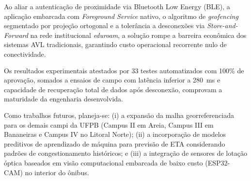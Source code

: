 \documentclass[lettersize,journal]{IEEEtran}
\begin{document}
Ao aliar a autenticação de proximidade via Bluetooth Low Energy (BLE), a aplicação embarcada com \textit{Foreground Service} nativo, o algoritmo de \textit{geofencing} segmentado por projeção ortogonal e a tolerância a desconexões via \textit{Store-and-Forward} na rede institucional \textit{eduroam}, a solução rompe a barreira econômica dos sistemas AVL tradicionais, garantindo custo operacional recorrente nulo de conectividade.

Os resultados experimentais atestados por 33 testes automatizados com 100\% de aprovação, somados a ensaios de campo com latência inferior a 280~ms e capacidade de recuperação total de dados após desconexão, comprovam a maturidade da engenharia desenvolvida.

Como trabalhos futuros, planeja-se: (i) a expansão da malha georreferenciada para os demais campi da UFPB (Campus II em Areia, Campus III em Bananeiras e Campus IV no Litoral Norte); (ii) a incorporação de modelos preditivos de aprendizado de máquina para previsão de ETA considerando padrões de congestionamento históricos; e (iii) a integração de sensores de lotação óptica baseados em visão computacional embarcada de baixo custo (ESP32-CAM) no interior do ônibus.
\end{document}
